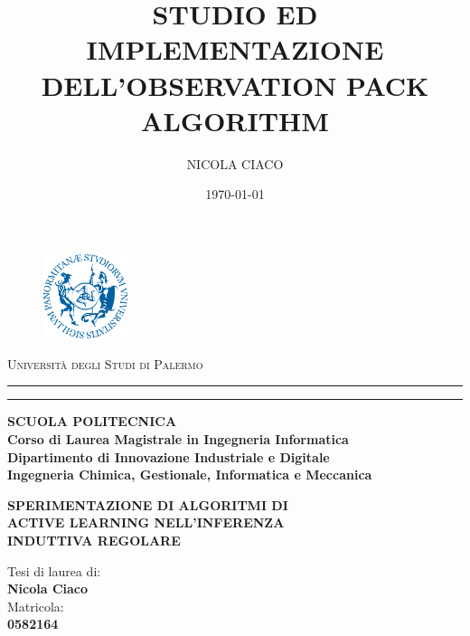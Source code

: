 \documentclass[12pt, oneside]{book}
\theoremstyle{definition}
\theoremstyle{plain}
\begin{document}
\pagestyle{empty}
\title{STUDIO ED IMPLEMENTAZIONE DELL'OBSERVATION PACK ALGORITHM}
\author{NICOLA CIACO}
\date{\today}

\begin{titlepage}
\begin{center}
\begin{figure}[!h]
  	\centering
 	\includegraphics[width=2.5cm]{./pictures/frontespizio/logo_unipa.png}
\end{figure}
{{\Large{\textsc{Università degli Studi di Palermo}}}} \\
\rule[0.1cm]{15.8cm}{0.1mm}
\rule[0.5cm]{15.8cm}{0.6mm}
{\small{\bf SCUOLA POLITECNICA\\
Corso di Laurea Magistrale in Ingegneria Informatica\\
Dipartimento di Innovazione Industriale e Digitale \\Ingegneria Chimica, Gestionale, Informatica e Meccanica}}\\
\vspace{10mm}
\end{center}
\vspace{10mm}
\begin{center}
{\LARGE{\bf SPERIMENTAZIONE DI ALGORITMI DI }}\\
\vspace{3mm}
{\LARGE{\bf ACTIVE LEARNING NELL’INFERENZA }}\\
 \vspace{3mm}
 {\LARGE{\bf INDUTTIVA REGOLARE}}\\
\end{center}
\vspace{18mm}
\par
\noindent
\begin{minipage}[t]{0.70\textwidth}\raggedright
{\large Tesi di laurea di:\\
\vspace{3mm}
\textbf {Nicola Ciaco}\\
\vspace{10mm}
Matricola:\\
\vspace{3mm}
\textbf {0582164}\\

}
\end{minipage}
\end{titlepage}
\end{document}
